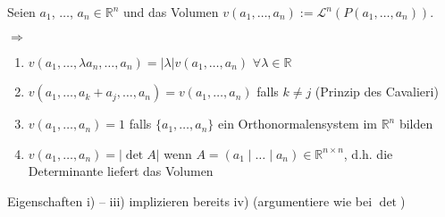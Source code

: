 \begin{proposition}
	Seien $a_1$, $\dotsc$, $a_n\in\mathbb{R}^n$ und das Volumen $v(a_1,\dotsc,a_n) := \mathcal{L}^n(P(a_1,\dotsc,a_n))$.
	
	\hspace*{0.5em}$\Rightarrow$\begin{minipage}[t]{0.8\linewidth}
		\vspace{-0.5\baselineskip}
		\begin{enumerate}[label={\roman*)}]
			\item $v(a_1,\dotsc,\lambda a_n,\dotsc,a_n) = \vert \lambda \vert v(a_1,\dotsc, a_n)$ $\forall \lambda\in\mathbb{R}$
			\item $v(a_1,\dotsc, a_k + a_j,\dotsc, a_n) = v(a_1,\dotsc, a_n)$ falls $k\neq j$ (Prinzip des Cavalieri)
			\item $v(a_1,\dotsc, a_n) = 1$ falls $\{a_1,\dotsc, a_n\}$ ein Orthonormalensystem im $\mathbb{R}^n$ bilden
			\item $v(a_1,\dotsc, a_n) = \vert \det A\vert$ wenn $A = (a_1\mid \dotsc\mid a_n)\in\mathbb{R}^{n\times n}$, d.h. die Determinante liefert das Volumen
		\end{enumerate}
	\end{minipage}
\end{proposition}

\begin{underlinedenvironment}[beachte]
	Eigenschaften i) -- iii) implizieren bereits iv) (argumentiere wie bei $\det$)
\end{underlinedenvironment}

